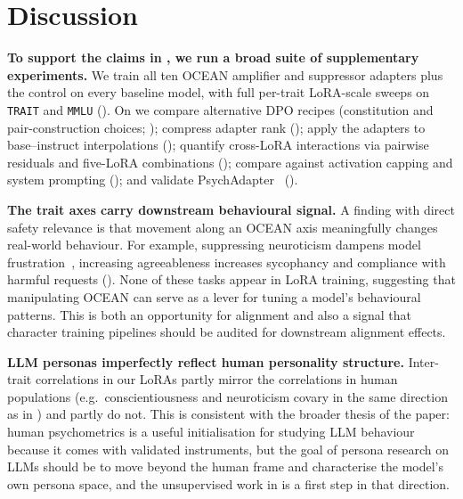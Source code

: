 \section{Discussion}\label{sec:discussion}
\textbf{To support the claims in , we run a broad suite of supplementary experiments.} We train all ten OCEAN amplifier and suppressor adapters plus the control on every baseline model, with full per-trait LoRA-scale sweeps on \texttt{TRAIT} and \texttt{MMLU} (). On \LlamaThreePointOneSizeEightBInstruct{} we compare alternative DPO recipes (constitution and pair-construction choices; ); compress adapter rank (); apply the adapters to base--instruct interpolations (); quantify cross-LoRA interactions via pairwise residuals and five-LoRA combinations (); compare against activation capping and system prompting (); and validate PsychAdapter~\citep{vu2026psychadapter} ().

\textbf{The trait axes carry downstream behavioural signal.} A finding with direct safety relevance is that movement along an OCEAN axis meaningfully changes real-world behaviour. For example, suppressing neuroticism dampens model frustration~\citep{soligo2026gemma}, increasing agreeableness increases sycophancy and compliance with harmful requests (). None of these tasks appear in LoRA training, suggesting that manipulating OCEAN can serve as a lever for tuning a model's behavioural patterns. This is both an opportunity for alignment and also a signal that character training pipelines should be audited for downstream alignment effects. 

\textbf{LLM personas imperfectly reflect human personality structure.} Inter-trait correlations in our LoRAs partly mirror the correlations in human populations (e.g.\ conscientiousness and neuroticism covary in the same direction as in \citet{digman1990personality}) and partly do not.
This is consistent with the broader thesis of the paper: human psychometrics is a useful initialisation for studying LLM behaviour because it comes with validated instruments, but the goal of persona research on LLMs should be to move beyond the human frame and characterise the model's own persona space, and the unsupervised work in  is a first step in that direction.

